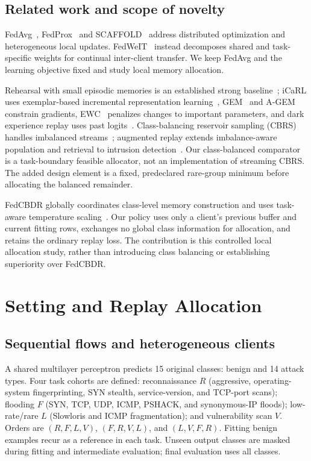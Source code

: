 \documentclass[journal,10pt]{IEEEtran}
\begin{document}
\subsection{Related work and scope of novelty}
FedAvg~\cite{fedavg}, FedProx~\cite{fedprox} and SCAFFOLD~\cite{scaffold} address distributed optimization and heterogeneous local updates. FedWeIT~\cite{fedweit} instead decomposes shared and task-specific weights for continual inter-client transfer. We keep FedAvg and the learning objective fixed and study local memory allocation.

Rehearsal with small episodic memories is an established strong baseline~\cite{tiny}; iCaRL uses exemplar-based incremental representation learning~\cite{icarl}, GEM~\cite{gem} and A-GEM~\cite{agem} constrain gradients, EWC~\cite{ewc} penalizes changes to important parameters, and dark experience replay uses past logits~\cite{der}. Class-balancing reservoir sampling (CBRS) handles imbalanced streams~\cite{cbrs}; augmented replay extends imbalance-aware population and retrieval to intrusion detection~\cite{amr}. Our class-balanced comparator is a task-boundary feasible allocator, not an implementation of streaming CBRS. The added design element is a fixed, predeclared rare-group minimum before allocating the balanced remainder.

FedCBDR globally coordinates class-level memory construction and uses task-aware temperature scaling~\cite{fedcbdr}. Our policy uses only a client's previous buffer and current fitting rows, exchanges no global class information for allocation, and retains the ordinary replay loss. The contribution is this controlled local allocation study, rather than introducing class balancing or establishing superiority over FedCBDR.

\section{Setting and Replay Allocation}
\subsection{Sequential flows and heterogeneous clients}
A shared multilayer perceptron predicts 15 original classes: benign and 14 attack types. Four task cohorts are defined: reconnaissance $R$ (aggressive, operating-system fingerprinting, SYN stealth, service-version, and TCP-port scans); flooding $F$ (SYN, TCP, UDP, ICMP, PSHACK, and synonymous-IP floods); low-rate/rare $L$ (Slowloris and ICMP fragmentation); and vulnerability scan $V$. Orders are $(R,F,L,V)$, $(F,R,V,L)$, and $(L,V,F,R)$. Fitting benign examples recur as a reference in each task. Unseen output classes are masked during fitting and intermediate evaluation; final evaluation uses all classes.
\end{document}
